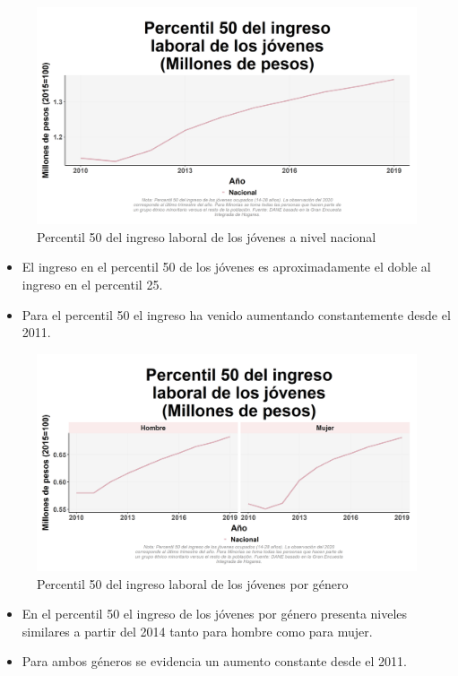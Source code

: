     \begin{figure}[H]
        \caption{Percentil 50 del ingreso laboral de los jóvenes a nivel nacional \label{map_result_2} }
        \begin{center}
        \includegraphics[width=\textwidth,keepaspectratio]{img/var_23_trend.png}
        \end{center}
    \end{figure}
            \begin{itemize}
                \item El ingreso en el percentil 50 de los jóvenes es aproximadamente el doble al ingreso en el percentil 25.
                \item Para el percentil 50 el ingreso ha venido aumentando constantemente desde el 2011.
                \end{itemize}

    \begin{figure}[H]
        \caption{Percentil 50 del ingreso laboral de los jóvenes por género \label{map_result_2} }
        \begin{center}
        \includegraphics[width=\textwidth,keepaspectratio]{img/var_22_trend.png}
        \end{center}
    \end{figure}
            \begin{itemize}
                \item En el percentil 50 el ingreso de los jóvenes por género presenta niveles similares a partir del 2014 tanto para hombre como para mujer.
                \item Para ambos géneros se evidencia un aumento constante desde el 2011.
                \end{itemize}

